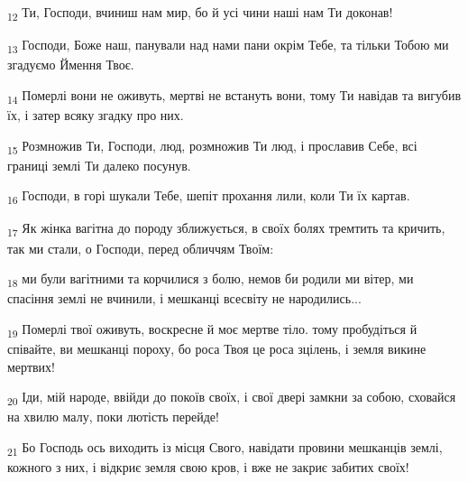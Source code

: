 \begin{tcolorbox}
\textsubscript{12} Ти, Господи, вчиниш нам мир, бо й усі чини наші нам Ти доконав!
\end{tcolorbox}
\begin{tcolorbox}
\textsubscript{13} Господи, Боже наш, панували над нами пани окрім Тебе, та тільки Тобою ми згадуємо Ймення Твоє.
\end{tcolorbox}
\begin{tcolorbox}
\textsubscript{14} Померлі вони не оживуть, мертві не встануть вони, тому Ти навідав та вигубив їх, і затер всяку згадку про них.
\end{tcolorbox}
\begin{tcolorbox}
\textsubscript{15} Розмножив Ти, Господи, люд, розмножив Ти люд, і прославив Себе, всі границі землі Ти далеко посунув.
\end{tcolorbox}
\begin{tcolorbox}
\textsubscript{16} Господи, в горі шукали Тебе, шепіт прохання лили, коли Ти їх картав.
\end{tcolorbox}
\begin{tcolorbox}
\textsubscript{17} Як жінка вагітна до породу зближується, в своїх болях тремтить та кричить, так ми стали, о Господи, перед обличчям Твоїм:
\end{tcolorbox}
\begin{tcolorbox}
\textsubscript{18} ми були вагітними та корчилися з болю, немов би родили ми вітер, ми спасіння землі не вчинили, і мешканці всесвіту не народились...
\end{tcolorbox}
\begin{tcolorbox}
\textsubscript{19} Померлі твої оживуть, воскресне й моє мертве тіло. тому пробудіться й співайте, ви мешканці пороху, бо роса Твоя це роса зцілень, і земля викине мертвих!
\end{tcolorbox}
\begin{tcolorbox}
\textsubscript{20} Іди, мій народе, ввійди до покоїв своїх, і свої двері замкни за собою, сховайся на хвилю малу, поки лютість перейде!
\end{tcolorbox}
\begin{tcolorbox}
\textsubscript{21} Бо Господь ось виходить із місця Свого, навідати провини мешканців землі, кожного з них, і відкриє земля свою кров, і вже не закриє забитих своїх!
\end{tcolorbox}
